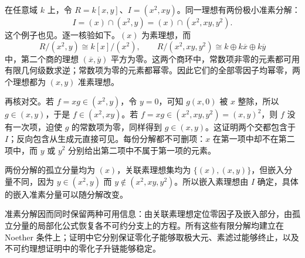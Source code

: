\begin{example}\label{g5:exm:nonunique-embedded-component}
	在任意域 \(k\) 上，令 \(R=k[x,y]\)、\(I=(x^2,xy)\)。同一理想有两份极小准素分解：
	\[
		I=(x)\cap(x^2,y)
		=(x)\cap(x^2,xy,y^2).
	\]
	这个例子也见\cite[第6节，习题6.6]{Matsumura1989}。逐一核验如下。\((x)\) 为素理想，而
	\[
		R/(x^2,y)\cong k[x]/(x^2),\qquad
		R/(x^2,xy,y^2)\cong k\oplus k\overline x\oplus k\overline y
	\]
	中，第二个商的理想 \((\overline x,\overline y)\) 平方为零。这两个商环中，常数项非零的元素都可用有限几何级数求逆；常数项为零的元素都幂零。因此它们的全部零因子均幂零，两个理想都为 \((x,y)\) 准素理想。

	再核对交。若 \(f=xg\in(x^2,y)\)，令 \(y=0\)，可知 \(g(x,0)\) 被 \(x\) 整除，所以 \(g\in(x,y)\)，于是 \(f\in(x^2,xy)\)。若 \(f=xg\in(x^2,xy,y^2)=(x,y)^2\)，则 \(f\) 没有一次项，迫使 \(g\) 的常数项为零，同样得到 \(g\in(x,y)\)。这证明两个交都包含于 \(I\)；反向包含从生成元直接可见。每份分解都不可删项：\(x\) 在第一项中却不在第二项中，而 \(y\) 或 \(y^2\) 分别给出第二项中不属于第一项的元素。

	两份分解的孤立分量均为 \((x)\)，关联素理想集均为 \(\{(x),(x,y)\}\)，但嵌入分量不同，因为 \(y\in(x^2,y)\) 而 \(y\notin(x^2,xy,y^2)\)。所以嵌入素理想由 \(I\) 确定，具体的嵌入准素分量可以随分解改变。
\end{example}

准素分解因而同时保留两种可用信息：由关联素理想定位零因子及嵌入部分，由孤立分量的局部化公式恢复各不可约分支上的方程。所有这些有限分解均建立在 Noether 条件上；证明中它分别保证零化子能够取极大元、素滤过能够终止，以及不可约理想证明中的零化子升链能够稳定。
